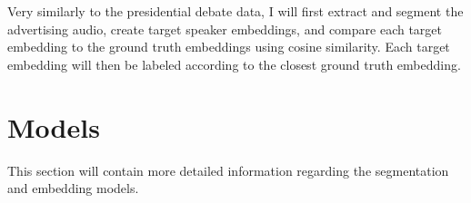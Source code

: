 \documentclass[12pt]{article}
\begin{document}
Very similarly to the presidential debate data, I will first extract and segment the advertising audio, create target speaker embeddings, and compare each target embedding to the ground truth embeddings using cosine similarity. Each target embedding will then be labeled according to the closest ground truth embedding. 

\section{Models}

This section will contain more detailed information regarding the segmentation and embedding models.





% 
% 
% 
% 

\end{document}

